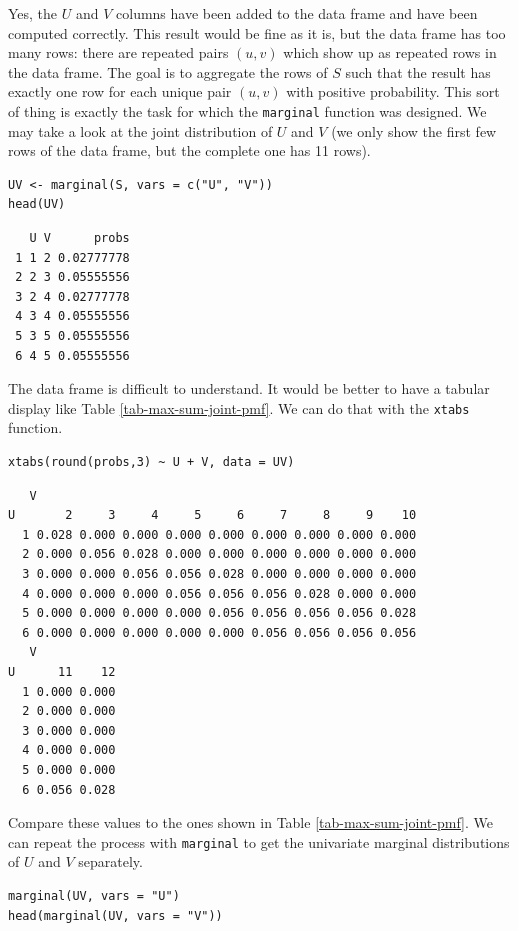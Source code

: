 \documentclass[captions=tableheading]{scrbook}
\begin{document}
Yes, the \(U\) and \(V\) columns have been added to the data frame and have been computed correctly. This result would be fine as it is, but the data frame has too many rows: there are repeated pairs \((u,v)\) which show up as repeated rows in the data frame. The goal is to aggregate the rows of \(S\) such that the result has exactly one row for each unique pair \((u,v)\) with positive probability. This sort of thing is exactly the task for which the \texttt{marginal} function was designed. We may take a look at the joint distribution of \(U\) and \(V\) (we only show the first few rows of the data frame, but the complete one has 11 rows).


\lstset{language=R}
\begin{lstlisting}
UV <- marginal(S, vars = c("U", "V"))
head(UV)
\end{lstlisting}

\begin{verbatim}
   U V      probs
 1 1 2 0.02777778
 2 2 3 0.05555556
 3 2 4 0.02777778
 4 3 4 0.05555556
 5 3 5 0.05555556
 6 4 5 0.05555556
\end{verbatim}

The data frame is difficult to understand. It would be better to have a tabular display like Table \ref{tab-max-sum-joint-pmf}. We can do that with the \texttt{xtabs} function. 


\lstset{language=R}
\begin{lstlisting}
xtabs(round(probs,3) ~ U + V, data = UV)
\end{lstlisting}


\begin{verbatim}
   V
U       2     3     4     5     6     7     8     9    10
  1 0.028 0.000 0.000 0.000 0.000 0.000 0.000 0.000 0.000
  2 0.000 0.056 0.028 0.000 0.000 0.000 0.000 0.000 0.000
  3 0.000 0.000 0.056 0.056 0.028 0.000 0.000 0.000 0.000
  4 0.000 0.000 0.000 0.056 0.056 0.056 0.028 0.000 0.000
  5 0.000 0.000 0.000 0.000 0.056 0.056 0.056 0.056 0.028
  6 0.000 0.000 0.000 0.000 0.000 0.056 0.056 0.056 0.056
   V
U      11    12
  1 0.000 0.000
  2 0.000 0.000
  3 0.000 0.000
  4 0.000 0.000
  5 0.000 0.000
  6 0.056 0.028
\end{verbatim}

Compare these values to the ones shown in Table \ref{tab-max-sum-joint-pmf}. We can repeat the process with \texttt{marginal} to get the univariate marginal distributions of \(U\) and \(V\) separately.


\lstset{language=R}
\begin{lstlisting}
marginal(UV, vars = "U")
head(marginal(UV, vars = "V"))
\end{lstlisting}
\end{document}
